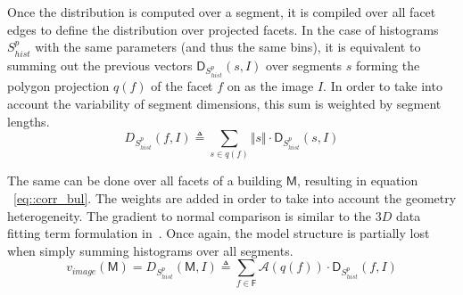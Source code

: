 \documentclass[runningheads]{llncs}
\begin{document}
\begin{figure}
	\begin{center}
	\end{center}
\end{figure}

Once the distribution is computed over a segment, it is compiled over all facet edges to define the distribution over projected facets. In the case of histograms $S_{hist}^p$ with the same parameters (and thus the same bins), it is equivalent to summing out the previous vectors $\mathsf{D}_{S_{hist}^p}(s, I)$ over segments $s$ forming the polygon projection $q(f)$ of the facet $f$ on as the image $I$. In order to take into account the variability of segment dimensions, this sum is weighted by segment lengths.
\begin{equation}
	\label{eq::corr_fac}
	D_{S_{hist}^p}(f, I) \triangleq \sum_{s \in q(f)} \Vert s \Vert \cdot \mathsf{D}_{S_{hist}^p}(s, I)
\end{equation}

The same can be done over all facets of a building $\mathsf{M}$, resulting in equation ~\ref{eq::corr_bul}. The weights are added in order to take into account the geometry heterogeneity. The gradient to normal comparison is similar to the $3D$ data fitting term formulation in~\cite{li2016boxfitting}. Once again, the model structure is partially lost when simply summing histograms over all segments.
\begin{equation}
	\label{eq::corr_bul}
	v_{image}(\mathsf{M}) = D_{S_{hist}^p}(\mathsf{M}, I) \triangleq \sum_{f \in \mathsf{F}} \mathscr{A}(q(f)) \cdot \mathsf{D}_{S_{hist}^p}(f, I)
\end{equation}
\end{document}
